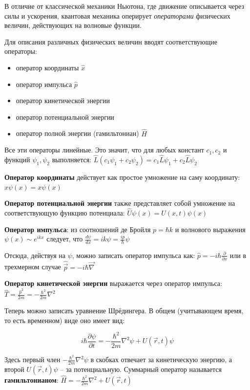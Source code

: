 \documentclass[12pt]{article}
\begin{document}
В отличие от классической механики Ньютона, где движение описывается через силы и ускорения, квантовая механика оперирует \textit{операторами} физических величин, действующих на волновые функции.  

Для описания различных физических величин вводят соответствующие операторы:

\begin{itemize}
    \item оператор координаты $\hat{x}$
    \item оператор импульса $\hat{p}$
    \item оператор кинетической энергии
    \item оператор потенциальной энергии
    \item оператор полной энергии (гамильтониан) $\hat{H}$
\end{itemize}

Все эти операторы линейные. Это значит, что для любых констант $c_1, c_2$ и функций $\psi_1, \psi_2$ выполняется: $\hat{L}(c_1 \psi_1 + c_2 \psi_2) = c_1 \hat{L}\psi_1 + c_2 \hat{L}\psi_2$


\textbf{Оператор координаты} действует как простое умножение на саму координату: $\hat{x}\psi(x) = x\psi(x)$

\textbf{Оператор потенциальной энергии} также представляет собой умножение на соответствующую функцию потенциала: $\hat{U}\psi(x) = U(x, t)\psi(x)$

\textbf{Оператор импульса}: из соотношений де Бройля $p = \hbar k$ и волнового выражения $\psi(x) \sim e^{ikx}$ следует, что $\frac{d\psi}{dx} = i k \psi = \frac{i p}{\hbar}\psi$

Отсюда, действуя на $\psi$, можно записать оператор импульса как: $\hat{p} = - i \hbar \frac{\partial}{\partial x}$ или в трехмерном случае $\hat{\vec{p}} = - i \hbar \vec{\nabla}$

\textbf{Оператор кинетической энергии} выражается через оператор импульса: $\hat{T} = \frac{\hat{p}^2}{2m} = -\frac{\hbar^2}{2m}\nabla^2$

\mediumvspace

Теперь можно записать уравнение Шрёдингера. В общем (учитывающем время, то есть временном) виде оно имеет вид:

\[
i\hbar \frac{\partial \psi}{\partial t} = -\frac{\hbar^2}{2m}\nabla^2 \psi + U(\vec r, t)\psi
\]

Здесь первый член $-\frac{\hbar^2}{2m}\nabla^2 \psi$ в скобках отвечает за кинетическую энергию, а второй $U(\vec r, t) \psi$ -- за потенциальную. Суммарный оператор называется \textbf{гамильтонианом}: $\hat{H} = -\frac{\hbar^2}{2m}\nabla^2 + U(\vec r, t)$
\end{document}

